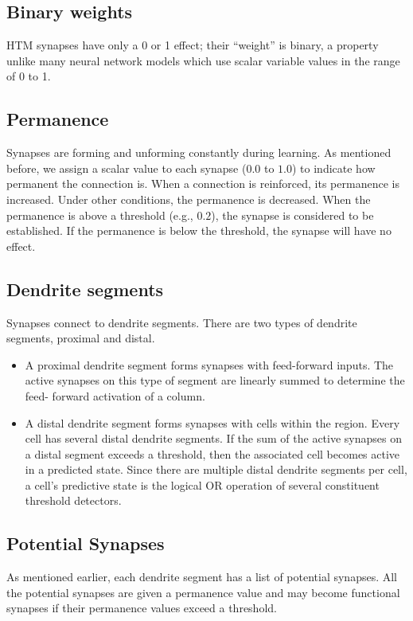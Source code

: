 \documentclass{report}
\begin{document}
\subsection*{Binary weights}
HTM synapses have only a 0 or 1 effect; their ``weight'' is binary, a
property unlike many neural network models which use scalar variable
values in the range of 0 to 1.

\subsection*{Permanence}
Synapses are forming and unforming constantly during learning. As
mentioned before, we assign a scalar value to each synapse ($0.0$ to
$1.0$) to indicate how permanent the connection is. When a connection is
reinforced, its permanence is increased. Under other conditions, the
permanence is decreased. When the permanence is above a threshold
(e.g., $0.2$), the synapse is considered to be established. If the
permanence is below the threshold, the synapse will have no effect.

\subsection*{Dendrite segments}
Synapses connect to dendrite segments. There are two types of dendrite
segments, proximal and distal.
\begin{itemize}
\item A proximal dendrite segment forms synapses with feed-forward
  inputs. The active synapses on this type of segment are linearly
  summed to determine the feed- forward activation of a column.

\item A distal dendrite segment forms synapses with cells within the
  region. Every cell has several distal dendrite segments. If the sum
  of the active synapses on a distal segment exceeds a threshold, then
  the associated cell becomes active in a predicted state. Since there
  are multiple distal dendrite segments per cell, a cell's predictive
  state is the logical OR operation of several constituent threshold
  detectors.
\end{itemize}

\subsection*{Potential Synapses}
As mentioned earlier, each dendrite segment has a list of potential synapses. All the potential synapses are given a permanence value and may become functional synapses if their permanence values exceed a threshold.
\end{document}
